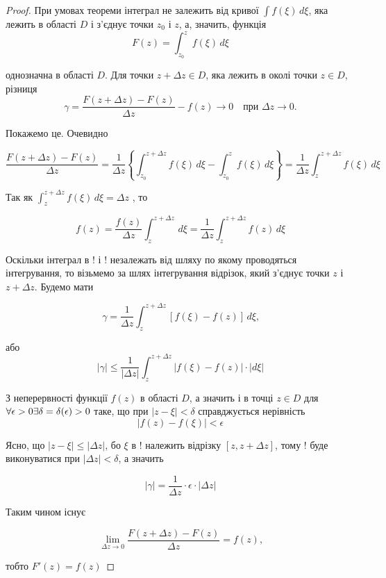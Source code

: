 \documentclass[12pt,fleqn]{article}
\theoremstyle{theorem}
\theoremstyle{proof}
\numberwithin{figure}{section}
\numberwithin{equation}{section}
\begin{document}
\begin{proof}
При умовах теореми інтеграл  не залежить від кривої \(\int f(\xi) \,d\xi \), яка лежить в області $D$ і з'єднує точки $z_0$ і $z$, а, значить, функція
\[ F(z) = \int_{z_0}^{z} f(\xi) \,d\xi \]

однозначна в області $D$. Для точки $z+ \Delta z\in D$, яка лежить в околі точки $z \in D$, різниця
\[ \gamma = \frac{F(z+\Delta z)-F(z)}{\Delta z} - f(z) \longrightarrow 0 \quad \text{при $\Delta z \rightarrow 0$.} \]

Покажемо це. Очевидно

\begin{equation}\label{xy}
\frac{F(z+\Delta z) - F(z)}{\Delta z} = \frac{1}{\Delta z} \left\{ \int_{z_0}^{z+\Delta z} f(\xi) \,d\xi - \int_{z_0}^{z} f(\xi) \,d\xi \right\} = \frac{1}{\Delta z} \int_{z}^{z+\Delta z} f(\xi) \,d\xi
\end{equation}

Так як \(\int_{z}^{z+\Delta z} f(\xi) \,d\xi = \Delta z \) , то

\begin{equation}\label{xy}
f(z) = \frac{f(z)}{\Delta z} \int_{z}^{z+\Delta z} \,d\xi = \frac{1}{\Delta z} \int_{z}^{z+\Delta z} f(z) \,d\xi
\end{equation}

Оскільки інтеграл в ! і ! незалежать від шляху по якому проводяться інтегрування, то візьмемо за шлях інтегрування відрізок, який з'єднує точки $z$ і $z+\Delta z$. Будемо мати

\[ \gamma = \frac{1}{\Delta z} \int_{z}^{z+\Delta z}\left[ f(\xi) - f(z) \right] \,d\xi \text{,} \]

або
\begin{equation}\label{xy}
|\gamma| \leq \frac{1}{|\Delta z|} \int_{z}^{z+\Delta z}\left| f(\xi) - f(z) \right|\cdot|d\xi|
\end{equation}

З неперервності функції $f(z)$ в області $D$, а значить і в точці $z\in D$ для $\\ \forall\epsilon > 0 \exists \delta = \delta(\epsilon) > 0$ таке, що при $|z-\xi|<\delta$ справджується нерівність
\begin{equation}\label{xy}
|f(z)-f(\xi)|<\epsilon
\end{equation}

Ясно, що $|z-\xi|\leq |\Delta z|$, бо $\xi$ в ! належить відрізку $[z, z+\Delta z]$, тому ! буде виконуватися при $|\Delta z| < \delta$, а значить

\[ |\gamma| = \frac{1}{\Delta z} \cdot \epsilon \cdot |\Delta z|  \]

Таким чином існує

\[ \lim_{\Delta z\to 0}\frac{F(z+\Delta z)-F(z)}{\Delta z}=f(z) \text{,} \]

тобто $F'(z)=f(z)$
\end{proof}
\end{document}
